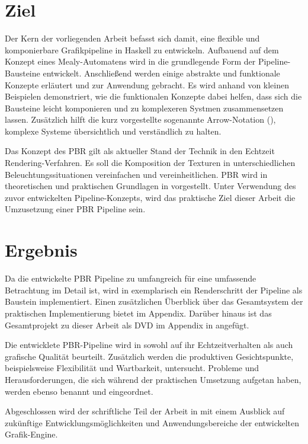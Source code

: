 \section{Ziel}

Der Kern der vorliegenden Arbeit befasst sich damit, eine flexible und komponierbare Grafikpipeline in Haskell zu entwickeln. Aufbauend auf dem Konzept eines Mealy-Automatens wird in  die grundlegende Form der Pipeline-Bausteine entwickelt. Anschließend werden einige abstrakte und funktionale Konzepte erläutert und zur Anwendung gebracht. Es wird anhand von kleinen Beispielen demonstriert, wie die funktionalen Konzepte dabei helfen, dass sich die Bausteine leicht komponieren und zu komplexeren Systmen zusammensetzen lassen. Zusätzlich hilft die kurz vorgestellte sogenannte Arrow-Notation (), komplexe Systeme übersichtlich und verständlich zu halten.

Das Konzept des \acl{PBR} gilt als aktueller Stand der Technik in den Echtzeit Rendering-Verfahren. Es soll die Komposition der Texturen in unterschiedlichen Beleuchtungssituationen vereinfachen und vereinheitlichen. \ac{PBR} wird in theoretischen und praktischen Grundlagen in  vorgestellt. Unter Verwendung des zuvor entwickelten Pipeline-Konzepts, wird das praktische Ziel dieser Arbeit die Umzusetzung einer \ac{PBR} Pipeline sein.

\section{Ergebnis}
Da die entwickelte \ac{PBR} Pipeline zu umfangreich für eine umfassende Betrachtung im Detail ist, wird in  exemplarisch ein Renderschritt der Pipeline als Baustein implementiert. Einen zusätzlichen Überblick über das Gesamtsystem der praktischen Implementierung bietet  im Appendix. Darüber hinaus ist das Gesamtprojekt zu dieser Arbeit als DVD im Appendix in  angefügt.

Die entwicklete \ac{PBR}-Pipeline wird in  sowohl auf ihr Echtzeitverhalten als auch grafische Qualität beurteilt. Zusätzlich werden die produktiven Gesichtspunkte, beispielsweise Flexibilität und Wartbarkeit, untersucht. Probleme und Herausforderungen, die sich während der praktischen Umsetzung aufgetan haben, werden ebenso benannt und eingeordnet.

Abgeschlossen wird der schriftliche Teil der Arbeit in  mit einem Ausblick auf zukünftige Entwicklungsmöglichkeiten und Anwendungsbereiche der entwickelten Grafik-Engine.

